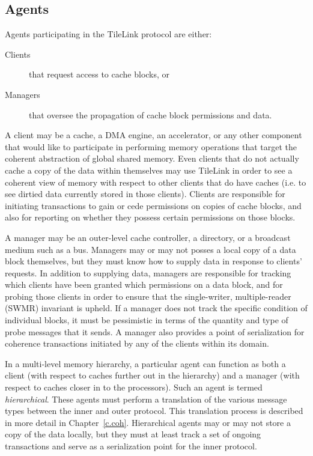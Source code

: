 \subsection{Agents}

Agents participating in the TileLink protocol are either:
\begin{description}
\item[Clients] that request access to cache blocks, or
\item[Managers] that oversee the propagation of cache block permissions and data.
\end{description}

A client may be a cache, a DMA engine, an accelerator, or any other component that would like to participate in performing memory operations that target the coherent abstraction of global shared memory.
Even clients that do not actually cache a copy of the data within themselves may use TileLink in order to see a coherent view of memory with respect to other clients that do have caches
(i.e. to see dirtied data currently stored in those clients).
Clients are responsible for initiating transactions to gain or cede permissions on copies of cache blocks, and also for reporting on whether they possess certain permissions on those blocks.

A manager may be an outer-level cache controller, a directory, or a broadcast medium such as a bus.
Managers may or may not posses a local copy of a data block themselves, but they must know how to supply data in response to clients' requests.
In addition to supplying data, managers are responsible for tracking which clients have been granted which permissions on a data block,
and for probing those clients in order to ensure that the 
single-writer, multiple-reader (SWMR) invariant \cite{sorin2011primer} is upheld.
If a manager does not track the specific condition of individual blocks, it must be pessimistic
in terms of the quantity and type of probe messages that it sends.
A manager also provides a point of serialization for coherence transactions
initiated by any of the clients within its domain.

In a multi-level memory hierarchy, a particular agent can function as both
a client (with respect to caches further out in the hierarchy)
and a manager (with respect to caches closer in to the processors).
Such an agent is termed {\em hierarchical}.
These agents must perform a translation of the various message types between the inner and outer protocol.
This translation process is described in more detail in Chapter~\ref{c.coh}.
Hierarchical agents may or may not store a copy of the data locally, but they must at least track a set of ongoing transactions and serve as a serialization point for the inner protocol.

